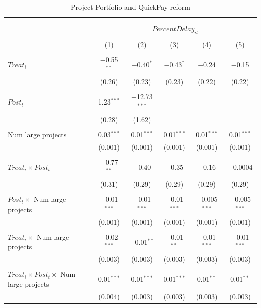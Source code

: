\documentclass[
]{article}
\begin{document}
\begin{table}[H] \centering 
  \caption{Project Portfolio and QuickPay reform} 
  \label{} 
\small 
\begin{tabular}{@{\extracolsep{-2pt}}lccccc} 
\\[-1.8ex]\hline 
\hline \\[-1.8ex] 
\\[-1.8ex] & \multicolumn{5}{c}{$PercentDelay_{it}$  } \\ 
\\[-1.8ex] & (1) & (2) & (3) & (4) & (5)\\ 
\hline \\[-1.8ex] 
 $Treat_i$ & $-$0.55$^{**}$ & $-$0.40$^{*}$ & $-$0.43$^{*}$ & $-$0.24 & $-$0.15 \\ 
  & (0.26) & (0.23) & (0.23) & (0.22) & (0.22) \\ 
  & & & & & \\ 
 $Post_t$ & 1.23$^{***}$ & $-$12.73$^{***}$ &  &  &  \\ 
  & (0.28) & (1.62) &  &  &  \\ 
  & & & & & \\ 
 Num large projects & 0.03$^{***}$ & 0.01$^{***}$ & 0.01$^{***}$ & 0.01$^{***}$ & 0.01$^{***}$ \\ 
  & (0.001) & (0.001) & (0.001) & (0.001) & (0.001) \\ 
  & & & & & \\ 
 $Treat_i \times Post_t$ & $-$0.77$^{**}$ & $-$0.40 & $-$0.35 & $-$0.16 & $-$0.0004 \\ 
  & (0.31) & (0.29) & (0.29) & (0.29) & (0.29) \\ 
  & & & & & \\ 
 $Post_t \times$ Num large projects & $-$0.01$^{***}$ & $-$0.01$^{***}$ & $-$0.01$^{***}$ & $-$0.005$^{***}$ & $-$0.005$^{***}$ \\ 
  & (0.001) & (0.001) & (0.001) & (0.001) & (0.001) \\ 
  & & & & & \\ 
 $Treat_i \times$ Num large projects & $-$0.02$^{***}$ & $-$0.01$^{**}$ & $-$0.01$^{**}$ & $-$0.01$^{***}$ & $-$0.01$^{***}$ \\ 
  & (0.003) & (0.003) & (0.003) & (0.003) & (0.003) \\ 
  & & & & & \\ 
 $Treat_i \times Post_t \times$ Num large projects & 0.01$^{***}$ & 0.01$^{***}$ & 0.01$^{***}$ & 0.01$^{**}$ & 0.01$^{**}$ \\ 
  & (0.004) & (0.003) & (0.003) & (0.003) & (0.003) \\ 

\end{tabular}
\end{table}
\end{document}
